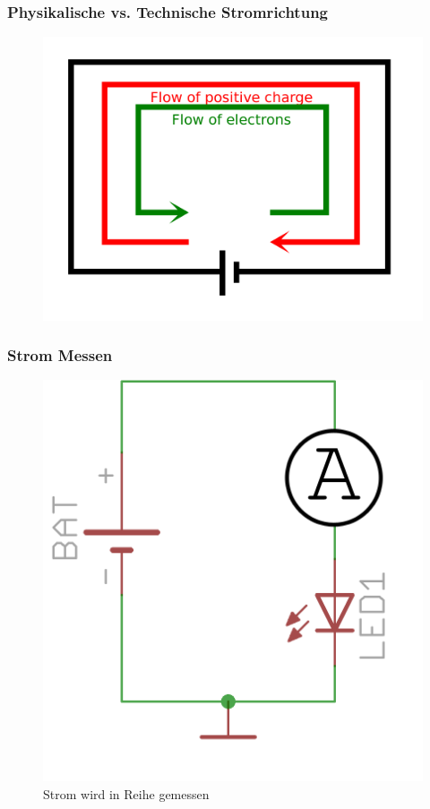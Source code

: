 \begin{frame}
  \frametitle{Physikalische vs. Technische Stromrichtung}
  \begin{center}
    \begin{figure}
      \includegraphics[width=.7\textwidth,height=.75\textheight,keepaspectratio]{e02/Current_notation.png}
    \end{figure}
  \end{center}
\end{frame}

\begin{frame}
  \frametitle{Strom Messen}
  \begin{center}
    \begin{figure}
      \includegraphics[width=.5\textwidth,height=.75\textheight,keepaspectratio]{e02/reiheAmpare.png}
      \caption{Strom wird in Reihe gemessen}
    \end{figure}
  \end{center}
\end{frame}

